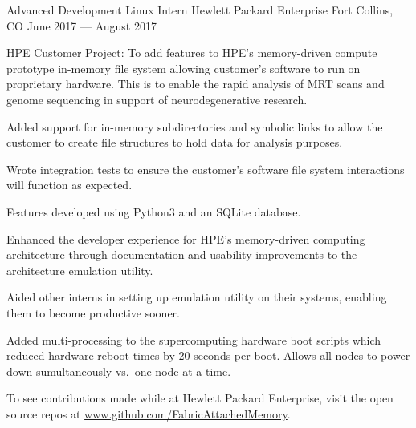 

\begin{cventries}

  \cventry
    {Advanced Development Linux Intern} %
    {Hewlett Packard Enterprise} %
    {Fort Collins, CO} %
    {June 2017 --- August 2017} %
    {
      \begin{cvitems} %
        \item {HPE Customer Project:  To add features to HPE’s memory-driven compute prototype in-memory file system allowing customer’s software to run on proprietary hardware. This is to enable the rapid analysis of MRT scans and genome sequencing in support of neurodegenerative research.}
        \item {Added support for in-memory subdirectories and symbolic links to allow the customer to create file structures to hold data for analysis purposes.}
        \item {Wrote integration tests to ensure the customer's software file system interactions will function as expected.}
        \item {Features developed using Python3 and an SQLite database.}
        \item {Enhanced the developer experience for HPE's memory-driven computing architecture through documentation and usability improvements to the architecture emulation utility.}
        \item {Aided other interns in setting up emulation utility on their systems, enabling them to become productive sooner.}
        \item {Added multi-processing to the supercomputing hardware boot scripts which reduced hardware reboot times by 20 seconds per boot. Allows all nodes to power down sumultaneously vs.\ one node at a time.}
        \item {To see contributions made while at Hewlett Packard Enterprise, visit the open source repos at \url{www.github.com/FabricAttachedMemory}.} 
      \end{cvitems}
    }


\end{cventries}
